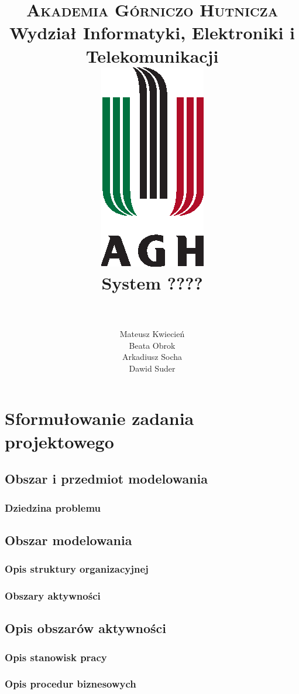 \documentclass[paper=a4, fontsize=11pt]{scrartcl}
\title{
		\usefont{OT1}{bch}{b}{n}
		\normalfont \normalsize \textsc{Akademia Górniczo Hutnicza} \\ [25pt]
		Wydział Informatyki, Elektroniki i Telekomunikacji
		\horrule{0.5pt} \\[1cm]
		\includegraphics[width=.35\textwidth]{img/agh_znk_wbr_cmyk.eps} \\[1.5cm]
		\huge System ???? \\
		\horrule{0.5pt} \\[0cm]
}
\author{
		\normalfont \normalsize
        Mateusz Kwiecień\\[-3pt]	\normalsize
        Beata Obrok\\[-3pt]			\normalsize
        Arkadiusz Socha\\[-3pt]		\normalsize
        Dawid Suder\\[-3pt]			\normalsize
}
\date{}
\numberwithin{equation}{section}		%
\numberwithin{figure}{section}			%
\numberwithin{table}{section}				%
\begin{document}
\maketitle
\tableofcontents

\section{Sformułowanie zadania projektowego}

	\subsection{Obszar i przedmiot modelowania}

		\subsubsection{Dziedzina problemu}
			

	\subsection{Obszar modelowania}

		\subsubsection{Opis struktury organizacyjnej}
			

		\subsubsection{Obszary aktywności}
			

	\subsection{Opis obszarów aktywności}

		\subsubsection{Opis stanowisk pracy}
			

		\subsubsection{Opis procedur biznesowych}
			
\end{document}

